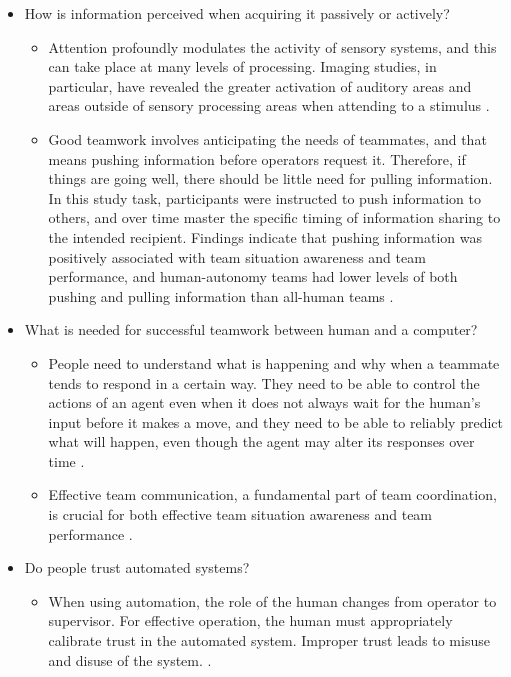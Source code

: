 \begin{itemize}
	\item How is information perceived when acquiring it passively or actively?
	\begin{itemize}
		\item Attention profoundly modulates the activity of sensory systems, and this can take place at many levels of processing. Imaging studies, in particular, have revealed the greater activation of auditory areas and areas outside of sensory processing areas when attending to a stimulus \cite{Palmer2007}.
		\item Good teamwork involves anticipating the needs of teammates, and that means pushing information before operators request it. Therefore, if things are going well, there should be little need for pulling information. In this study task, participants were instructed to push information to others, and over time master the specific timing of information sharing to the intended recipient. Findings indicate that pushing information was positively associated with team situation awareness and team performance, and human-autonomy teams had lower levels of both pushing and pulling information than all-human teams \cite{Demir2017}.
	\end{itemize}
	
	\item What is needed for successful teamwork between human and a computer?
	\begin{itemize}
		\item  People need to understand what is happening and why when a teammate tends to respond in a certain way. They need to be able to control the actions of an agent even when it does not always wait for the human’s input before it makes a move, and they need to be able to reliably predict what will happen, even though the agent may alter its responses over time \cite{Bradshaw2003}.
		\item Effective team communication, a fundamental part of team coordination, is crucial for both effective team situation awareness and team performance \cite{Demir2017}.
	\end{itemize}
	
	\item Do people trust automated systems?
	\begin{itemize}
		\item When using automation, the role of the human changes from operator to supervisor. For effective operation, the human must appropriately calibrate trust in the automated system. Improper trust leads to misuse and disuse of the system. \cite{Walliser2011}.
	\end{itemize}
\end{itemize}

